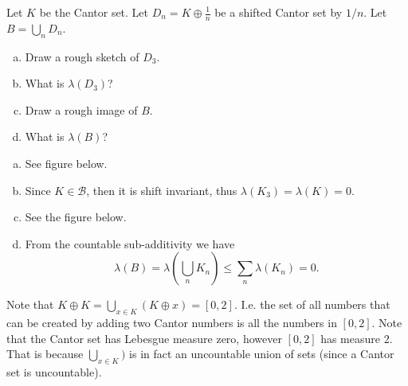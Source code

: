 \begin{problem}
	Let $ K $ be the Cantor set. Let $ D_n = K \oplus \frac{1}{n} $ be  a shifted Cantor set by $ 1/n $. Let $ B = \bigcup_n D_n $. 
	\begin{enumerate}[(a)]
		\item Draw a rough sketch of $ D_3 $.
		\item What is $ \lambda(D_3) $?
		\item Draw a rough image of $ B $.
		\item What is $ \lambda(B) $?
	\end{enumerate}
\end{problem}
\FloatBarrier
\begin{solution}
	\begin{enumerate}[(a)]
		\item See figure below.
		\item Since $ K \in \mathcal{B} $, then it is shift invariant, thus $ \lambda(K_3) = \lambda(K)  = 0 $.
		\item See the figure below.
		\item From the countable sub-additivity we have
		\[ \lambda(B) = \lambda(\bigcup_n K_n) \leq \sum_n \lambda(K_n) = 0. \]
	\end{enumerate}
	
	\FloatBarrier
\end{solution}
\begin{remark}
	Note that $ K \oplus K = \bigcup_{x\in K}( K \oplus x) = [0,2] $. I.e. the set of all numbers that can be created by adding two Cantor numbers is all the numbers in $ [0,2] $. Note that the Cantor set has Lebesgue measure zero, however $ [0,2] $ has measure 2. That is because $ \bigcup_{x\in K}) $ is in fact an uncountable union of sets (since a Cantor set is uncountable).
\end{remark}

